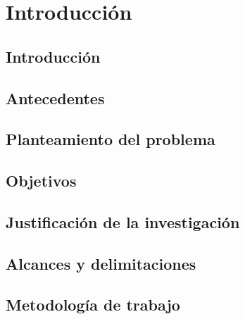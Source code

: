 \chapter{Introducción}

\section{Introducción}


\section{Antecedentes}


\section{Planteamiento del problema}


%

\section{Objetivos}


\section{Justificación de la investigación}


\section{Alcances y delimitaciones}


\section{Metodología de trabajo}


% 

% 